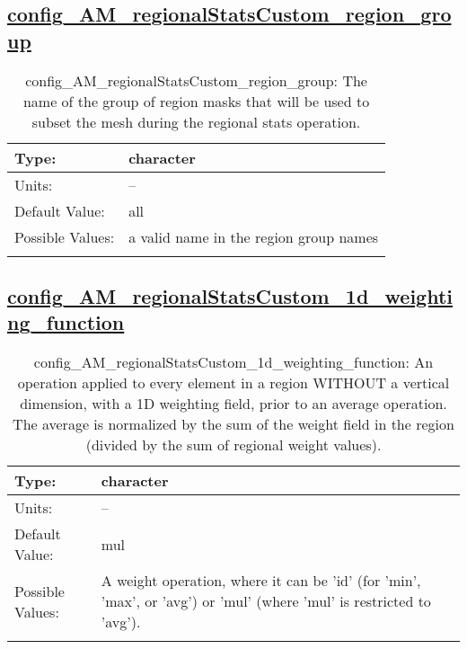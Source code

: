 \subsection[config\_AM\_regionalStatsCustom\_region\_group]{\hyperref[sec:nm_tab_AM_regionalStatsCustom]{config\_AM\_regionalStatsCustom\_region\_group}}
\label{subsec:nm_sec_config_AM_regionalStatsCustom_region_group}
\begin{center}
\begin{longtable}{| p{2.0in} || p{4.0in} |}
    \hline
    Type: & character \\
    \hline
    Units: & -- \\
    \hline
    Default Value: & all \\
    \hline
    Possible Values: & a valid name in the region group names \\
    \hline
    \caption{config\_AM\_regionalStatsCustom\_region\_group: The name of the group of region masks that will be used to subset the mesh during the regional stats operation.}
\end{longtable}
\end{center}
\subsection[config\_AM\_regionalStatsCustom\_1d\_weighting\_function]{\hyperref[sec:nm_tab_AM_regionalStatsCustom]{config\_AM\_regionalStatsCustom\_1d\_weighting\_function}}
\label{subsec:nm_sec_config_AM_regionalStatsCustom_1d_weighting_function}
\begin{center}
\begin{longtable}{| p{2.0in} || p{4.0in} |}
    \hline
    Type: & character \\
    \hline
    Units: & -- \\
    \hline
    Default Value: & mul \\
    \hline
    Possible Values: & A weight operation, where it can be 'id' (for 'min', 'max', or 'avg') or 'mul' (where 'mul' is restricted to 'avg'). \\
    \hline
    \caption{config\_AM\_regionalStatsCustom\_1d\_weighting\_function: An operation applied to every element in a region WITHOUT a vertical dimension, with a 1D weighting field, prior to an average operation. The average is normalized by the sum of the weight field in the region (divided by the sum of regional weight values).}
\end{longtable}
\end{center}
